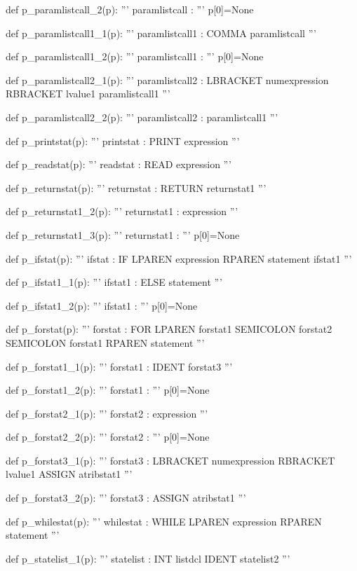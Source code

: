 \documentclass[
	12pt,				%
	openright,			%
	twoside,			%
	a4paper,			%
	english,			%
	french,				%
	spanish,			%
	brazil				%
	]{abntex2}
\begin{document}
\begin{python}
def p_paramlistcall_2(p):
    '''
    paramlistcall : 
    '''
    p[0]=None

def p_paramlistcall1_1(p):
    '''
    paramlistcall1 : COMMA paramlistcall
    '''

def p_paramlistcall1_2(p):
    '''
    paramlistcall1 : 
    '''
    p[0]=None

def p_paramlistcall2_1(p):
    '''
    paramlistcall2 : LBRACKET numexpression RBRACKET lvalue1 paramlistcall1
    '''

def p_paramlistcall2_2(p):
    '''
    paramlistcall2 : paramlistcall1
    '''


def p_printstat(p):
    '''
    printstat : PRINT expression
    '''

def p_readstat(p):
    '''
    readstat : READ expression
    '''

def p_returnstat(p):
    '''
    returnstat : RETURN returnstat1
    '''

def p_returnstat1_2(p):
    '''
    returnstat1 : expression
    '''

def p_returnstat1_3(p):
    '''
    returnstat1 : 
    '''
    p[0]=None

def p_ifstat(p):
    '''
    ifstat : IF LPAREN expression RPAREN statement ifstat1
    '''

def p_ifstat1_1(p):
    '''
    ifstat1 : ELSE statement
    '''

def p_ifstat1_2(p):
    '''
    ifstat1 : %
    '''
    p[0]=None

def p_forstat(p):
    '''
    forstat : FOR LPAREN forstat1 SEMICOLON forstat2 SEMICOLON forstat1 RPAREN statement
    '''

def p_forstat1_1(p):
    '''
    forstat1 : IDENT forstat3
    '''

def p_forstat1_2(p):
    '''
    forstat1 : 
    '''
    p[0]=None

def p_forstat2_1(p):
    '''
    forstat2 : expression
    '''

def p_forstat2_2(p):
    '''
    forstat2 : 
    '''
    p[0]=None

def p_forstat3_1(p):
    '''
    forstat3 : LBRACKET numexpression RBRACKET lvalue1 ASSIGN atribstat1
    '''

def p_forstat3_2(p):
    '''
    forstat3 : ASSIGN atribstat1
    '''

def p_whilestat(p):
    '''
    whilestat : WHILE LPAREN expression RPAREN statement
    '''

def p_statelist_1(p):
    '''
    statelist : INT listdcl IDENT statelist2
    '''


\end{python}
\end{document}
